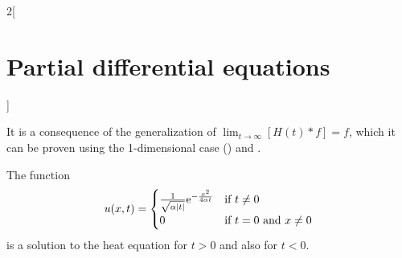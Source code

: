 \documentclass[../../../main_math.tex]{subfiles}
\begin{document}
\begin{multicols}{2}[\section{Partial differential equations}]
\begin{proposition}
  \end{proposition}
  \begin{sproof}
    It is a consequence of the generalization of $\displaystyle \lim_{t\to\infty}[H(t)*f]=f$, which it can be proven using the 1-dimensional case () and .
  \end{sproof}
  \begin{lemma}
    The function
    \begin{equation*}
      u(x,t)=\begin{cases}
        \frac{1}{\sqrt{\alpha\abs{t}}}\mathrm{e}^{-\frac{x^2}{4\alpha t}} & \text{if $t\ne 0$}           \\
        0                                                          & \text{if $t=0$ and $x\ne 0$}
      \end{cases}
    \end{equation*}
    is a solution to the heat equation for $t>0$ and also for $t<0$.
  \end{lemma}

\end{multicols}
\end{document}
